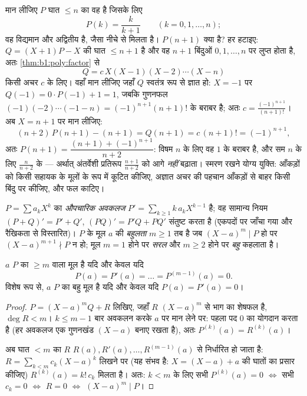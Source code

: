 \begin{example}[सहायक-बहुपद वाली युक्ति]\label{ex:b1:poly:auxiliary}
मान लीजिए $P$ घात $\leq n$ का वह  है जिसके लिए
\[
P(k) = \frac{k}{k+1} \qquad (k = 0, 1, \dots, n) ;
\]
वह विद्यमान और अद्वितीय है, जैसा नीचे  से मिलता है।
$P(n+1)$ क्या है? हर हटाइए:  $Q = (X+1)P - X$ की घात $\leq n + 1$ है और
वह $n + 1$ बिंदुओं $0, 1, \dots, n$ पर लुप्त होता है, अतः
\cref{thm:b1:poly:factor} से
\[
Q = c\,X(X-1)(X-2)\cdots(X-n)
\]
किसी अचर $c$ के लिए। वहाँ मान लीजिए जहाँ $Q$ स्वतंत्र रूप से ज्ञात हो: $X =
-1$ पर $Q(-1) = 0 \cdot P(-1) + 1 = 1$, जबकि गुणनफल $(-1)(-2)\cdots(-1-n) =
(-1)^{n+1}(n+1)!$ के बराबर है; अतः $c = \frac{(-1)^{n+1}}{(n+1)!}$। अब $X =
n + 1$ पर मान लीजिए:
\[
(n+2)\,P(n+1) - (n+1) = Q(n+1) = c\,(n+1)! = (-1)^{n+1} ,
\]
अतः $P(n+1) = \dfrac{(n+1) + (-1)^{n+1}}{n+2}$: विषम $n$ के लिए वह $1$ के
बराबर है, और सम $n$ के लिए $\frac{n}{n+2}$ के --- अर्थात् अंतर्वेशी 
प्रतिरूप $\frac{n+1}{n+2}$ को आगे \emph{नहीं} बढ़ाता। स्मरण रखने योग्य
युक्ति: आँकड़ों को किसी सहायक  के मूलों के रूप में कूटित कीजिए, अज्ञात
अचर की पहचान आँकड़ों से बाहर किसी बिंदु पर कीजिए, और फल काटिए।
\end{example}

\begin{definition}[अवकलज, बहुलता]\label{def:b1:poly:derivative}
$P = \sum a_k X^k$ का \emph{औपचारिक अवकलज} $P' = \sum_{k \geq 1} k\,a_k
X^{k-1}$ है; वह सामान्य नियम $(P+Q)' = P' + Q'$, $(PQ)' = P'Q + PQ'$ संतुष्ट
करता है (एकपदों पर जाँचा गया और रैखिकता से विस्तारित)। $P$ के मूल $a$ की
\emph{बहुलता} $m \geq 1$ तब है जब $(X-a)^m \mid P$ हो
पर $(X-a)^{m+1} \nmid P$ न हो; मूल $m = 1$ होने पर \emph{सरल} और $m \geq 2$
होने पर \emph{बहु} कहलाता है।
\end{definition}

\begin{proposition}[अवकलजों से बहुलता]\label{prop:b1:poly:multiplicity}
$a$ $P$ का  $\geq m$ वाला मूल है यदि और केवल यदि
\[
P(a) = P'(a) = \dots = P^{(m-1)}(a) = 0 .
\]
विशेष रूप से, $a$ $P$ का बहु मूल है यदि और केवल यदि $P(a) = P'(a) = 0$।
\end{proposition}

\begin{proof}
$P = (X - a)^m Q + R$ लिखिए, जहाँ $R$ $(X-a)^m$ से भाग का शेषफल है, $\deg R
< m$। $k \leq m - 1$ बार अवकलन करके $a$ पर मान लेने पर: पहला पद $0$ का
योगदान करता है (हर अवकलज एक गुणनखंड $(X-a)$ बनाए रखता है), अतः $P^{(k)}(a) =
R^{(k)}(a)$।

अब घात $< m$ का  $R$ $R(a), R'(a), \dots, R^{(m-1)}(a)$ से निर्धारित हो
जाता है: $R = \sum_{k < m} c_k (X - a)^k$ लिखने पर (यह संभव है: $X = (X - a)
+ a$ की घातों का प्रसार कीजिए) $R^{(k)}(a) = k!\, c_k$ मिलता है। अतः: $k <
m$ के लिए सभी $P^{(k)}(a) = 0$ $\iff$ सभी $c_k = 0$ $\iff$ $R = 0$ $\iff$
$(X-a)^m \mid P$।
\end{proof}

